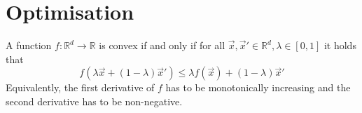 \section{Optimisation}
A function $f: \mathbb{R}^d \to \mathbb{R}$ is
convex if and only if for all
$\vec{x}, \vec{x}' \in \mathbb{R}^d, \lambda \in [0, 1]$ it
holds that
\begin{equation*}
    f(\lambda \vec{x} + (1- \lambda) \vec{x}')
    \leq
    \lambda f(\vec{x}) + (1 - \lambda) \vec{x}'
\end{equation*}
Equivalently, the first derivative of $f$
has to be monotonically increasing and the
second derivative has to be non-negative.
